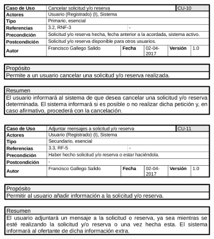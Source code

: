 	\begin{figure}[h!]
		\centering
		\includegraphics[width=0.9\linewidth]{img/casos/solicitudes_reservas/Caso_cancelacion_solicitudes}
		\label{fig:casocancelacionsolicitudes}
	\end{figure}
\clearpage
	\begin{figure}[h!]
		\centering
		\includegraphics[width=0.9\linewidth]{img/casos/solicitudes_reservas/Caso_adjuntar_mensaje_a_solicitud}
		\label{fig:casoadjuntarmensajeasolicitud}
	\end{figure}

